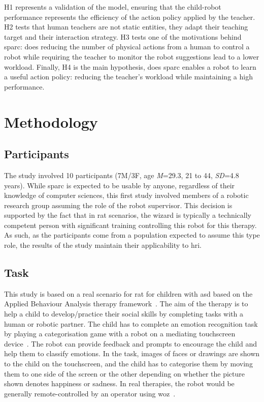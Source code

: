 H1 represents a validation of the model, ensuring that the child-robot performance represents the efficiency of the action policy applied by the teacher. H2 tests that human teachers are not static entities, they adapt their teaching target and their interaction strategy. H3 tests one of the motivations behind \gls{sparc}: does reducing the number of physical actions from a human to control a robot while requiring the teacher to monitor the robot suggestions lead to a lower workload. Finally, H4 is the main hypothesis, does \gls{sparc} enables a robot to learn a useful action policy: reducing the teacher's workload while maintaining a high performance.

\section{Methodology}

\subsection{Participants}

The study involved 10 participants (7M/3F, age \textit{M}=29.3, 21 to 44, \textit{SD}=4.8 years). While \gls{sparc} is expected to be usable by anyone, regardless of their knowledge of computer sciences, this first study involved members of a robotic research group assuming the role of the robot supervisor. This decision is supported by the fact that in \gls{rat} scenarios, the wizard is typically a technically competent person with significant training controlling this robot for this therapy. As such, as the participants come from a population expected to assume this type role, the results of the study maintain their applicability to \gls{hri}.

\subsection{Task}

This study is based on a real scenario for \gls{rat} for children with \gls{asd} based on the Applied Behaviour Analysis therapy framework~\citep{cooper2007applied}. The aim of the therapy is to help a child to develop/practice their social skills by completing tasks with a human or robotic partner. The child has to complete an emotion recognition task by playing a categorisation game with a robot on a mediating touchscreen device~\citep{baxter2012touchscreen}. The robot can provide feedback and prompts to encourage the child and help them to classify emotions. In the task, images of faces or drawings are shown to the child on the touchscreen, and the child has to categorise them by moving them to one side of the screen or the other depending on whether the picture shown denotes happiness or sadness. In real therapies, the robot would be generally remote-controlled by an operator using \gls{woz}~\citep{riek2012wizard}.%

